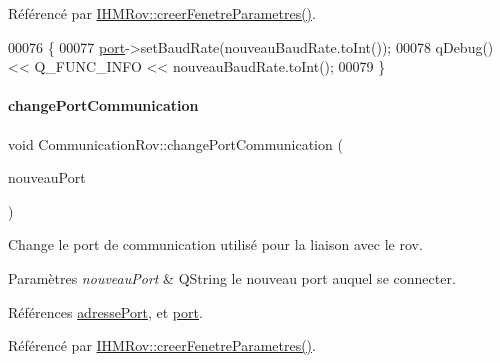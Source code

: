 Référencé par \hyperlink{class_i_h_m_rov_aed451139ac09ef18b7c92637761d80ce}{I\+H\+M\+Rov\+::creer\+Fenetre\+Parametres()}.


\begin{DoxyCode}
00076 \{
00077     \hyperlink{class_communication_rov_a21b62067ef0b2a6aec339df60b4abd72}{port}->setBaudRate(nouveauBaudRate.toInt());
00078     qDebug() << Q\_FUNC\_INFO << nouveauBaudRate.toInt();
00079 \}
\end{DoxyCode}
\mbox{\label{class_communication_rov_ad46397a58ba7704fbd5ac5748e083004}} 
\paragraph{\texorpdfstring{change\+Port\+Communication}{changePortCommunication}}
{\footnotesize\ttfamily void Communication\+Rov\+::change\+Port\+Communication (\begin{DoxyParamCaption}\item[{Q\+String}]{nouveau\+Port }\end{DoxyParamCaption})\hspace{0.3cm}{\ttfamily [slot]}}

Change le port de communication utilisé pour la liaison avec le rov.


\begin{DoxyParams}{Paramètres}
{\em nouveau\+Port} & Q\+String le nouveau port auquel se connecter. \\
\hline
\end{DoxyParams}


Références \hyperlink{class_communication_rov_a7bd5d36d065005b27ed6cb421c7ffe42}{adresse\+Port}, et \hyperlink{class_communication_rov_a21b62067ef0b2a6aec339df60b4abd72}{port}.



Référencé par \hyperlink{class_i_h_m_rov_aed451139ac09ef18b7c92637761d80ce}{I\+H\+M\+Rov\+::creer\+Fenetre\+Parametres()}.


